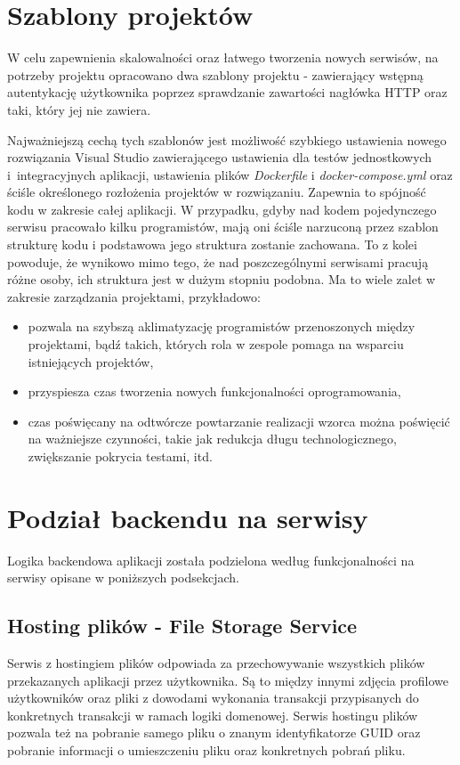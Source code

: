 \documentclass{SGGW-thesis}
\begin{document}
{\section{Szablony projektów}
W celu zapewnienia skalowalności oraz łatwego tworzenia nowych serwisów, na potrzeby projektu opracowano dwa szablony projektu - zawierający wstępną autentykację użytkownika poprzez sprawdzanie zawartości nagłówka HTTP oraz taki, który jej nie zawiera.

Najważniejszą cechą tych szablonów jest możliwość szybkiego ustawienia nowego rozwiązania Visual Studio zawierającego ustawienia dla testów jednostkowych i~integracyjnych aplikacji, ustawienia plików \textit{Dockerfile} i \textit{docker-compose.yml} oraz ściśle określonego rozłożenia projektów w rozwiązaniu. Zapewnia to spójność kodu w zakresie całej aplikacji. W przypadku, gdyby nad kodem pojedynczego serwisu pracowało kilku programistów, mają oni ściśle narzuconą przez szablon strukturę kodu i podstawowa jego struktura zostanie zachowana. To z kolei powoduje, że wynikowo mimo tego, że nad poszczególnymi serwisami pracują różne osoby, ich struktura jest w dużym stopniu podobna. Ma to wiele zalet w zakresie zarządzania projektami, przykładowo:

\begin{itemize}
	\item pozwala na szybszą aklimatyzację programistów przenoszonych między projektami, bądź takich, których rola w zespole pomaga na wsparciu istniejących projektów,
	\item przyspiesza czas tworzenia nowych funkcjonalności oprogramowania,
	\item czas poświęcany na odtwórcze powtarzanie realizacji wzorca można poświęcić na ważniejsze czynności, takie jak redukcja długu technologicznego, zwiększanie pokrycia testami, itd.
\end{itemize}

\section{Podział backendu na serwisy}
Logika backendowa aplikacji została podzielona według funkcjonalności na serwisy opisane w poniższych podsekcjach.

\subsection{Hosting plików - File Storage Service}
Serwis z hostingiem plików odpowiada za przechowywanie wszystkich plików przekazanych aplikacji przez użytkownika. Są to między innymi zdjęcia profilowe użytkowników oraz pliki z dowodami wykonania transakcji przypisanych do konkretnych transakcji w ramach logiki domenowej. Serwis hostingu plików pozwala też na pobranie samego pliku o znanym identyfikatorze GUID oraz pobranie informacji o umieszczeniu pliku oraz konkretnych pobrań pliku.

}
\end{document}
